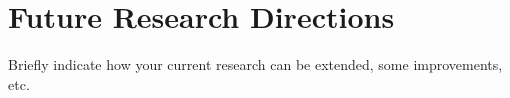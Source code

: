 

\chapter{Future Research Directions} %

Briefly indicate how your current research can be extended, some improvements, etc.

















\ifpdf
    \graphicspath{{8/figures/PNG/}{8/figures/PDF/}{8/figures/}}
\else
    \graphicspath{{8/figures/EPS/}{8/figures/}}
\fi

















